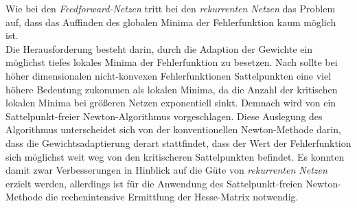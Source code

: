 Wie bei den \textit{Feedforward-Netzen} tritt bei den \textit{rekurrenten Netzen} das Problem auf, dass das Auffinden des globalen Minima der Fehlerfunktion kaum möglich ist. \\
Die Herausforderung besteht darin, durch die Adaption der Gewichte ein möglichst tiefes lokales Minima der Fehlerfunktion zu besetzen. Nach \cite{Dauphin.6102014} sollte bei höher dimensionalen nicht-konvexen Fehlerfunktionen Sattelpunkten eine viel höhere Bedeutung zukommen als lokalen Minima, da die Anzahl der kritischen lokalen Minima bei größeren Netzen exponentiell sinkt. Demnach wird von \cite{Dauphin.6102014} ein Sattelpunkt-freier Newton-Algorithmus vorgeschlagen. Diese Auslegung des Algorithmus unterscheidet sich von der konventionellen Newton-Methode darin, dass die Gewichtsadaptierung derart stattfindet, dass der Wert der Fehlerfunktion sich möglichst weit weg von den kritischeren Sattelpunkten befindet. Es konnten damit zwar Verbesserungen in Hinblick auf die Güte von \textit{rekurrenten Netzen} erzielt werden, allerdings ist für die Anwendung des Sattelpunkt-freien Newton-Methode die rechenintensive Ermittlung der Hesse-Matrix notwendig. \cite{Dauphin.6102014}  



   
 
 
 
